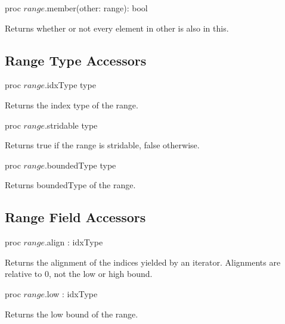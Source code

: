 \begin{protohead}
proc $range$.member(other: range): bool
\end{protohead}
\begin{protobody}
Returns whether or not every element in other is also in this.
\end{protobody}

\subsection{Range Type Accessors}

\begin{protohead}
proc $range$.idxType type
\end{protohead}
\begin{protobody}
Returns the index type of the range.
\end{protobody}

\begin{protohead}
proc $range$.stridable type
\end{protohead}
\begin{protobody}
Returns true if the range is stridable, false otherwise.
\end{protobody}

\begin{protohead}
proc $range$.boundedType type
\end{protohead}
\begin{protobody}
Returns boundedType of the range.
\end{protobody}

\subsection{Range Field Accessors}

\begin{protohead}
proc $range$.align : idxType
\end{protohead}
\begin{protobody}
Returns the alignment of the indices yielded by an iterator.  Alignments are
relative to 0, not the low or high bound.
\end{protobody}

\begin{protohead}
proc $range$.low : idxType
\end{protohead}
\begin{protobody}
Returns the low bound of the range.
\end{protobody}

